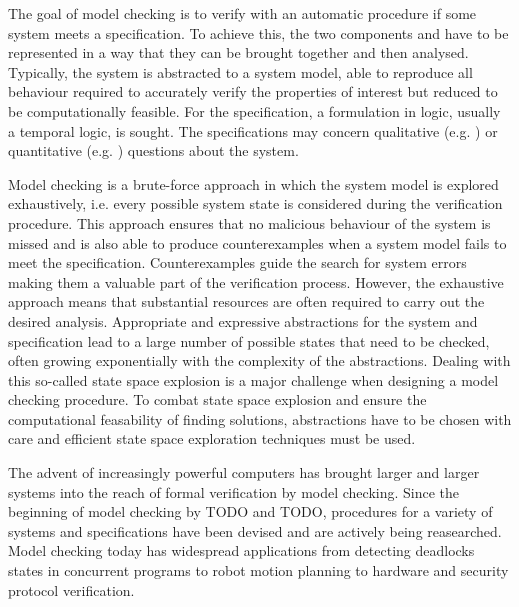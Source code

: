 The goal of model checking is to verify with an automatic procedure if some system meets a specification.
To achieve this, the two components  and  have to be represented in a way that they can be brought together and then analysed.
Typically, the system is abstracted to a system model, able to reproduce all behaviour required to accurately verify the properties of interest but reduced to be computationally feasible. %
For the specification, a formulation in logic, usually a temporal logic, is sought.
The specifications may concern qualitative (e.g. ) or quantitative (e.g. ) questions about the system.

Model checking is a brute-force approach in which the system model is explored exhaustively, i.e. every possible system state is considered during the verification procedure.
This approach ensures that no malicious behaviour of the system is missed and is also able to produce counterexamples when a system model fails to meet the specification.
Counterexamples guide the search for system errors making them a valuable part of the verification process. %
However, the exhaustive approach means that substantial resources are often required to carry out the desired analysis.
Appropriate and expressive abstractions for the system and specification lead to a large number of possible states that need to be checked, often growing exponentially with the complexity of the abstractions.
Dealing with this so-called state space explosion is a major challenge when designing a model checking procedure.
To combat state space explosion and ensure the computational feasability of finding solutions, abstractions have to be chosen with care and efficient state space exploration techniques must be used.

The advent of increasingly powerful computers has brought larger and larger systems into the reach of formal verification by model checking.
Since the beginning of model checking by TODO and TODO, procedures for a variety of systems and specifications have been devised and are actively being reasearched. %
Model checking today has widespread applications from detecting deadlocks states in concurrent programs to robot motion planning to hardware and security protocol verification. %

